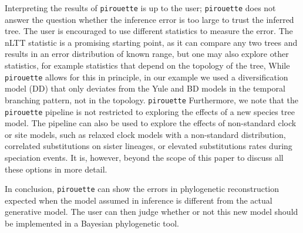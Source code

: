 Interpreting the results of \verb;pirouette; is up to the user; 
\verb;pirouette; does not answer the question 
whether the inference error is too large to trust the inferred tree. The user is encouraged to use different statistics to measure the error. The nLTT statistic is
a promising starting point, as it can compare any two trees and 
results in an error distribution of known range, but one may also explore other statistics, for example statistics that depend on the topology of the tree,
While \verb;pirouette; allows for this in principle, in our example we used a diversification model (DD) that only deviates from the Yule and BD models in the temporal branching pattern, not in the topology.
    \verb;pirouette;
Furthermore, we note that the \verb;pirouette; pipeline is not restricted 
to exploring the effects of a new species tree model. 
The pipeline can also be used to explore the effects of non-standard 
clock or site models, such as relaxed clock models with a non-standard 
distribution, correlated substitutions on sister lineages, or elevated 
substitutions rates during speciation events. 
It is, however, beyond the scope of this paper to discuss all these options 
in more detail.

In conclusion, \verb;pirouette; can show the errors in phylogenetic reconstruction expected
when the model assumed in inference is different from the actual generative model.
The user can then judge whether or not this new model 
should be implemented in a Bayesian phylogenetic tool. 




